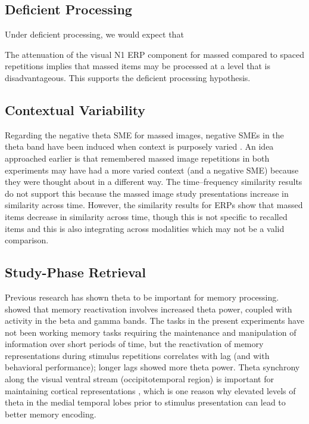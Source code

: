 \subsection{Deficient Processing}

Under deficient processing, we would expect that


The attenuation of the visual N1 ERP component for massed compared to spaced repetitions implies that massed items may be processed at a level that is disadvantageous.  This supports the deficient processing hypothesis.



\subsection{Contextual Variability}




Regarding the negative theta SME for massed images, negative SMEs in the theta band have been induced when context is purposely varied \cite{StauHans2013}.  An idea approached earlier is that remembered massed image repetitions in both experiments may have had a more varied context (and a negative SME) because they were thought about in a different way.  The time--frequency similarity results do not support this because the massed image study presentations increase in similarity across time.  However, the similarity results for ERPs show that massed items decrease in similarity across time, though this is not specific to recalled items and this is also integrating across modalities which may not be a valid comparison.

\subsection{Study-Phase Retrieval}


Previous research has shown theta to be important for memory processing.
 showed that memory reactivation involves increased theta power, coupled with activity in the beta and gamma bands.
The tasks in the present experiments have not been working memory tasks requiring the maintenance and manipulation of information over short periods of time, but the reactivation of memory representations during stimulus repetitions correlates with lag (and with behavioral performance); longer lags showed more theta power.
Theta synchrony along the visual ventral stream (occipitotemporal region) is important for maintaining cortical representations \cite{DuzeEtal2010}, which is one reason why elevated levels of theta in the medial temporal lobes prior to stimulus presentation can lead to better memory encoding.

